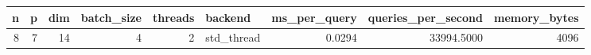 \begin{tabular}{rrrrrlrrr}
\toprule
n & p & dim & batch_size & threads & backend & ms_per_query & queries_per_second & memory_bytes \\
\midrule
8 & 7 & 14 & 4 & 2 & std_thread & 0.0294 & 33994.5000 & 4096 \\
\bottomrule
\end{tabular}
